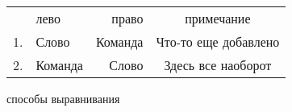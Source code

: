 	\centering
\begin{tabular}[t]{|c|l|r|c|}
	\hline
	\textnumero&лево&право&примечание\\
	1.&Слово&Команда&Что-то еще добавлено\\
	2.&Команда&Слово&Здесь все наоборот\\
	\hline
\end{tabular}
\caption{способы выравнивания}
